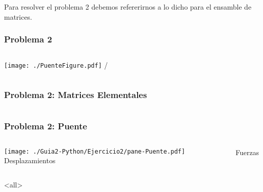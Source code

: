 Para resolver el problema 2 debemos refererirnos a lo dicho para el
ensamble de matrices.

\mode*
\begin{frame}[label=FramePuente1]
    \frametitle<presentation>{Problema 2}
    \begin{columns}
	\texttt{[image: ./PuenteFigure.pdf]} / %
            
    \end{columns}
\end{frame}

\begin{frame}[label=FramePuenteMatrices]
    \frametitle<presentation>{Problema 2: Matrices Elementales}
    \begin{columns}
            
        \begin{codeblock}
        
        \end{codeblock}
    \end{columns}
\end{frame}

\begin{frame}[label=FramePuenteSolucion]
    \frametitle<presentation>{Problema 2: Puente}
    \begin{columns}
            \texttt{[image: ./Guia2-Python/Ejercicio2/pane-Puente.pdf]}
        Desplazamientos
            
        Fuerzas

            
    \end{columns}
\end{frame}
\mode<all>
